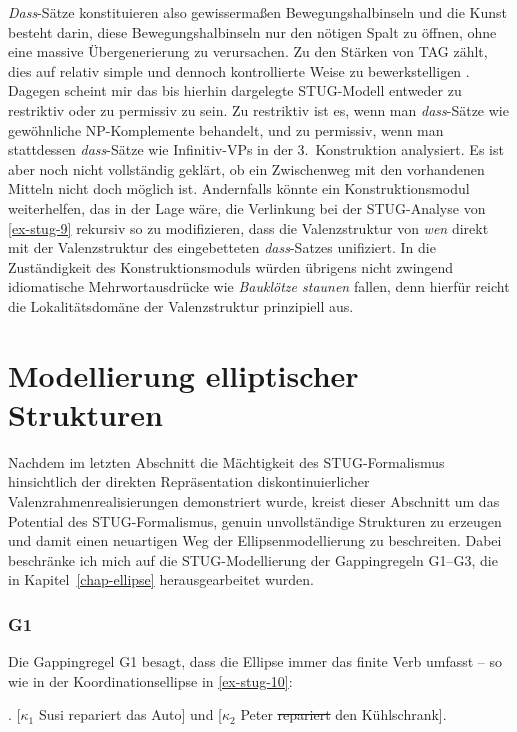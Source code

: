 \textit{Dass}-Sätze konstituieren also gewissermaßen Bewegungshalbinseln und die Kunst besteht darin, diese Bewegungshalbinseln nur den nötigen Spalt zu öffnen, ohne eine massive Übergenerierung zu verursachen. Zu den Stärken von TAG zählt, dies auf relativ simple und dennoch kontrollierte Weise zu bewerkstelligen \citep{Kroch:89}. Dagegen scheint mir das bis hierhin dargelegte STUG-Modell entweder zu restriktiv oder zu permissiv zu sein. Zu restriktiv ist es, wenn man \textit{dass}-Sätze wie gewöhnliche NP-Komplemente behandelt, und zu permissiv, wenn man stattdessen \textit{dass}-Sätze wie Infinitiv-VPs in der 3.\ Konstruktion analysiert. Es ist aber noch nicht vollständig geklärt, ob ein Zwischenweg mit den vorhandenen Mitteln nicht doch möglich ist. Andernfalls könnte ein Konstruktionsmodul weiterhelfen, das in der Lage wäre, die Verlinkung bei der STUG-Analyse von \ref{ex-stug-9} rekursiv so zu modifizieren, dass die Valenzstruktur von {\it wen} direkt mit der Valenzstruktur des eingebetteten \emph{dass}-Satzes unifiziert. In die Zuständigkeit des Konstruktionsmoduls würden übrigens nicht zwingend idiomatische Mehrwortausdrücke wie {\it Bauklötze staunen} fallen, denn hierfür reicht die Lokalitätsdomäne der Valenzstruktur prinzipiell aus.


\section{Modellierung elliptischer Strukturen} \label{sec-stug-ellipse}

Nachdem im letzten Abschnitt die Mächtigkeit des STUG-Formalismus hinsichtlich der direkten Repräsentation diskontinuierlicher Valenzrahmenrealisierungen demonstriert wurde, kreist dieser Abschnitt um das Potential des STUG-Formalismus, genuin unvollständige Strukturen zu erzeugen und damit einen neuartigen Weg der Ellipsenmodellierung zu beschreiten. Dabei beschränke ich mich auf die STUG-Modellierung der Gappingregeln G1--G3, die in Kapitel~\ref{chap-ellipse} herausgearbeitet wurden. 

\subsubsection*{G1}

Die Gappingregel G1 besagt, dass die Ellipse immer das finite Verb umfasst -- so wie in der Koordinationsellipse in \ref{ex-stug-10}:

\ex. \label{ex-stug-10} [$\kappa_1$ Susi repariert das Auto] und [$\kappa_2$ Peter \sout{repariert} den Kühlschrank]. 

